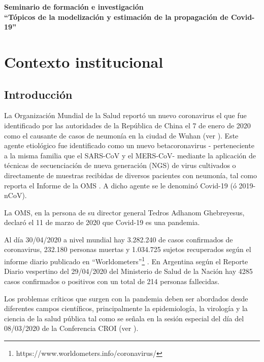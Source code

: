 \documentclass{article}
\begin{document}
\date{}

\begin{center}
 {\bf \large{Seminario de formación e investigación \\ ``Tópicos de la modelización y estimación de la propagación de Covid-19''
 		\\
 }}
\vspace{0.5cm}

\end{center}





\section{Contexto institucional}



 \subsection{Introducción}

La Organización Mundial de la Salud reportó un nuevo coronavirus el que fue identificado por las autoridades de la República de China el 7 de enero de 2020 como el causante de casos de neumonía en la ciudad de Wuhan (ver \cite{chen2020mathematical}). Este agente etiológico fue identificado como un nuevo betacoronavirus - perteneciente a la misma familia que el  SARS-CoV y el MERS-CoV-  mediante la aplicación de técnicas de secuenciación de nueva generación (NGS) de virus cultivados o directamente de muestras recibidas de diversos pacientes con neumonía, tal como reporta el Informe de la OMS \cite{OMS1}. A dicho agente se le denominó   Covid-19 (ó 2019-nCoV).




La OMS, en la persona de su director general Tedros Adhanom Ghebreyesus, declaró el 11 de marzo de 2020 que  Covid-19 es una pandemia.


Al día   30/04/2020  a nivel mundial hay  3.282.240 de casos confirmados de coronavirus,   232.180  personas muertas y 1.034.725  sujetos recuperados según el informe diario publicado en  ``Worldometers''\footnote{https://www.worldometers.info/coronavirus/} . En Argentina según el Reporte Diario vespertino del   29/04/2020 del Ministerio de Salud de la Nación hay  4285 casos confirmados o positivos con un total de 214 personas fallecidas. 

Los problemas críticos que surgen con la pandemia deben ser abordados desde diferentes campos científicos, principalmente la epidemiología, la virología y  la ciencia de la salud pública tal como se señala en la sesión especial del día del 08/03/2020  de la Conferencia CROI   (ver \cite{croi}). 
\end{document}
